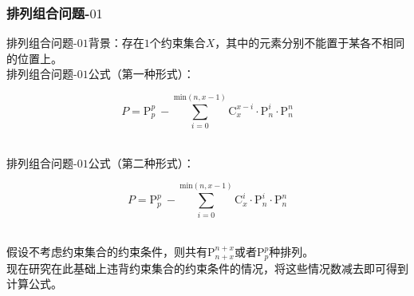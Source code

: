 \documentclass[UTF8]{ctexart}
\newcommand{\rnum}[1]{\uppercase\expandafter{\romannumeral #1\relax}}
\newcommand{\Pe}{\mathrm{P}}
\newcommand{\Co}{\mathrm{C}}
\begin{document}
\subsubsection{排列组合问题\rnum{1}-$01$}
    \setcounter{equation}{0}
    排列组合问题\rnum{1}-$01$背景：存在$1$个约束集合$X$，其中的元素分别不能置于某各不相同的位置上。\\[3mm]
    排列组合问题\rnum{1}-$01$公式（第一种形式）：
    \begin{large}
        \begin{equation*}
            P=\Pe_p^p~-\sum_{i=0}^{\mathrm{min}(n,x-1)}\Co_x^{x-i}\cdot\Pe_n^i\cdot\Pe_n^n
        \end{equation*}
    \end{large}\\
    排列组合问题\rnum{1}-$01$公式（第二种形式）：
    \begin{large}
        \begin{equation*}
            P=\Pe_p^p~-\sum_{i=0}^{\mathrm{min}(n,x-1)}\Co_x^i\cdot\Pe_n^i\cdot\Pe_n^n
        \end{equation*}
    \end{large}\\
    假设不考虑约束集合的约束条件，则共有$\Pe_{n+x}^{n+x}$或者$\Pe_p^p$种排列。\\[3mm]
    现在研究在此基础上违背约束集合的约束条件的情况，将这些情况数减去即可得到计算公式。

\newpage
\end{document}
